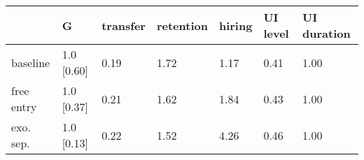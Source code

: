 \begin{tabular}{lllllll}
\toprule
 & \textbf{G} & \textbf{transfer} & \textbf{retention} & \textbf{hiring} & \textbf{UI level} & \textbf{UI duration} \\
\midrule
baseline & 1.0 [0.60] & 0.19 & 1.72 & 1.17 & 0.41 & 1.00 \\
free entry & 1.0 [0.37] & 0.21 & 1.62 & 1.84 & 0.43 & 1.00 \\
exo. sep. & 1.0 [0.13] & 0.22 & 1.52 & 4.26 & 0.46 & 1.00 \\
\bottomrule
\end{tabular}
